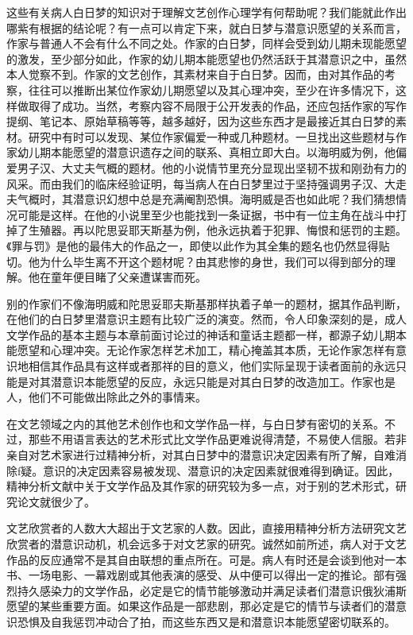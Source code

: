 \documentclass[UTF8,10pt,a4paper,openany]{book}
\begin{document}
这些有关病人白日梦的知识对于理解文艺创作心理学有何帮助呢？我们能就此作出哪紫有根据的结论呢？有一点可以肯定下来，就白日梦与潜意识愿望的关系而言，作家与普通人不会有什么不同之处。作家的白日梦，同样会受到幼儿期未现能愿望的激发，至少部分如此，作家的幼儿期本能愿望也仍然活跃于其潜意识之中，虽然本人觉察不到。作家的文艺创作，其素材来自于白日梦。因而，由对其作品的考察，往往可以推断出某位作家幼儿期愿望以及其心理冲突，至少在许多情况下，这样做取得了成功。当然，考察内容不局限于公开发表的作品，还应包括作家的写作提纲、笔记本、原始草稿等等，越多越好，因为这些东西才是最接近其白日梦的素材。研究中有时可以发现、某位作家偏爱一种或几种题材。一旦找出这些题材与作家幼儿期本能愿望的潜意识遗存之间的联系、真相立即大白。以海明威为例，他偏爱男子汉、大丈夫气概的题材。他的小说情节里充分显现出坚韧不拔和刚劲有力的风采。而由我们的临床经验证明，每当病人在白日梦里过于坚持强调男子汉、大走夫气概时，其潜意识幻想中总是充满阉割恐惧。海明威是否也如此呢？我们猜想情况可能是这样。在他的小说里至少也能找到一条证据，书中有一位主角在战斗中打掉了生殖器。再以陀思妥耶天斯基为例，他永远执着于犯罪、悔恨和惩罚的主题。《罪与罚》是他的最伟大的作品之一，即使以此作为其全集的题名也仍然显得贴切。他为什么毕生离不开这个题材呢？由其悲惨的身世，我们可以得到部分的理解。他在童年便目睹了父亲遭谋害而死。

别的作家们不像海明威和陀思妥耶夫斯基那样执着子单一的题材，据其作品判断，在他们的白日梦里潜意识主题有比较广泛的演变。然而，令人印象深刻的是，成人文学作品的基本主题与本章前面讨论过的神话和童话主题都一样，都源子幼儿期本能愿望和心理冲突。无论作家怎样艺术加工，精心掩盖其本质，无论作家怎样有意识地相信其作品具有这样或者那祥的目的意义，他们实际呈现于读者面前的永远只能是对其潜意识本能愿望的反应，永远只能是对其白日梦的改造加工。作家也是人，他们不可能做出除此之外的事情来。

在文艺领域之内的其他艺术创作也和文学作品一样，与白日梦有密切的关系。不过，那些不用语言表达的艺术形式比文学作品更难说得清楚，不易使人信服。若非亲自对艺术家进行过精神分析，对其白日梦中的潜意识决定因素有所了解，自难消除f疑。意识的决定因素容易被发现、潜意识的决定因素就很难得到确证。因此，精神分析文献中关于文学作品及其作家的研究较为多一点，对于别的艺术形式，研究论文就很少了。

文艺欣赏者的人数大大超出于文艺家的人数。因此，直接用精神分析方法研究文艺欣赏者的潜意识动机，机会远多于对文艺家的研究。诚然如前所述，病人对于文艺作品的反应通常不是其自由联想的重点所在。可是。病人有时还是会谈到他对一本书、一场电影、一幕戏剧或其他表演的感受、从中便可以得出一定的推论。部有强烈持久感染力的文学作品，必定是它的情节能够激动并满足读者们潜意识俄狄浦斯愿望的某些重要方面。如果这作品是一部悲剧，那必定是它的情节与读者们的潜意识恐惧及自我惩罚冲动合了拍，而这些东西又是和潜意识本能愿望密切联系的。
\end{document}
